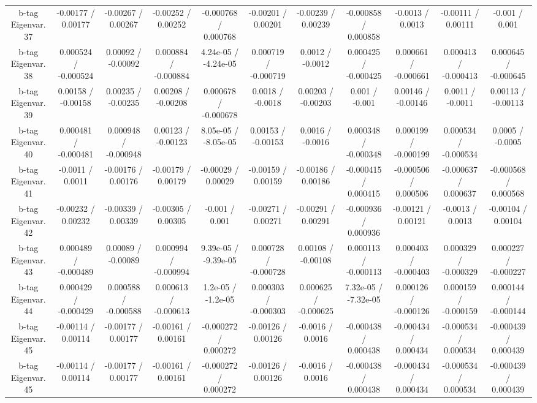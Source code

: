 \begin{table}[htbp]
\begin{center}
\begin{tabular}{|c|c|c|c|c|c|c|c|c|c|c|}
  b-tag Eigenvar. 37 & -0.00177 / 0.00177 & -0.00267 / 0.00267 & -0.00252 / 0.00252 & -0.000768 / 0.000768 & -0.00201 / 0.00201 & -0.00239 / 0.00239 & -0.000858 / 0.000858 & -0.0013 / 0.0013 & -0.00111 / 0.00111 & -0.001 / 0.001 \\ 
  b-tag Eigenvar. 38 & 0.000524 / -0.000524 & 0.00092 / -0.00092 & 0.000884 / -0.000884 & 4.24e-05 / -4.24e-05 & 0.000719 / -0.000719 & 0.0012 / -0.0012 & 0.000425 / -0.000425 & 0.000661 / -0.000661 & 0.000413 / -0.000413 & 0.000645 / -0.000645 \\ 
  b-tag Eigenvar. 39 & 0.00158 / -0.00158 & 0.00235 / -0.00235 & 0.00208 / -0.00208 & 0.000678 / -0.000678 & 0.0018 / -0.0018 & 0.00203 / -0.00203 & 0.001 / -0.001 & 0.00146 / -0.00146 & 0.0011 / -0.0011 & 0.00113 / -0.00113 \\ 
  b-tag Eigenvar. 40 & 0.000481 / -0.000481 & 0.000948 / -0.000948 & 0.00123 / -0.00123 & 8.05e-05 / -8.05e-05 & 0.00153 / -0.00153 & 0.0016 / -0.0016 & 0.000348 / -0.000348 & 0.000199 / -0.000199 & 0.000534 / -0.000534 & 0.0005 / -0.0005 \\ 
  b-tag Eigenvar. 41 & -0.0011 / 0.0011 & -0.00176 / 0.00176 & -0.00179 / 0.00179 & -0.00029 / 0.00029 & -0.00159 / 0.00159 & -0.00186 / 0.00186 & -0.000415 / 0.000415 & -0.000506 / 0.000506 & -0.000637 / 0.000637 & -0.000568 / 0.000568 \\ 
  b-tag Eigenvar. 42 & -0.00232 / 0.00232 & -0.00339 / 0.00339 & -0.00305 / 0.00305 & -0.001 / 0.001 & -0.00271 / 0.00271 & -0.00291 / 0.00291 & -0.000936 / 0.000936 & -0.00121 / 0.00121 & -0.0013 / 0.0013 & -0.00104 / 0.00104 \\ 
  b-tag Eigenvar. 43 & 0.000489 / -0.000489 & 0.00089 / -0.00089 & 0.000994 / -0.000994 & 9.39e-05 / -9.39e-05 & 0.000728 / -0.000728 & 0.00108 / -0.00108 & 0.000113 / -0.000113 & 0.000403 / -0.000403 & 0.000329 / -0.000329 & 0.000227 / -0.000227 \\ 
  b-tag Eigenvar. 44 & 0.000429 / -0.000429 & 0.000588 / -0.000588 & 0.000613 / -0.000613 & 1.2e-05 / -1.2e-05 & 0.000303 / -0.000303 & 0.000625 / -0.000625 & 7.32e-05 / -7.32e-05 & 0.000126 / -0.000126 & 0.000159 / -0.000159 & 0.000144 / -0.000144 \\ 
  b-tag Eigenvar. 45 & -0.00114 / 0.00114 & -0.00177 / 0.00177 & -0.00161 / 0.00161 & -0.000272 / 0.000272 & -0.00126 / 0.00126 & -0.0016 / 0.0016 & -0.000438 / 0.000438 & -0.000434 / 0.000434 & -0.000534 / 0.000534 & -0.000439 / 0.000439 \\ 
  b-tag Eigenvar. 45 & -0.00114 / 0.00114 & -0.00177 / 0.00177 & -0.00161 / 0.00161 & -0.000272 / 0.000272 & -0.00126 / 0.00126 & -0.0016 / 0.0016 & -0.000438 / 0.000438 & -0.000434 / 0.000434 & -0.000534 / 0.000534 & -0.000439 / 0.000439 \\ 

\end{tabular}
\end{center}
\end{table}
